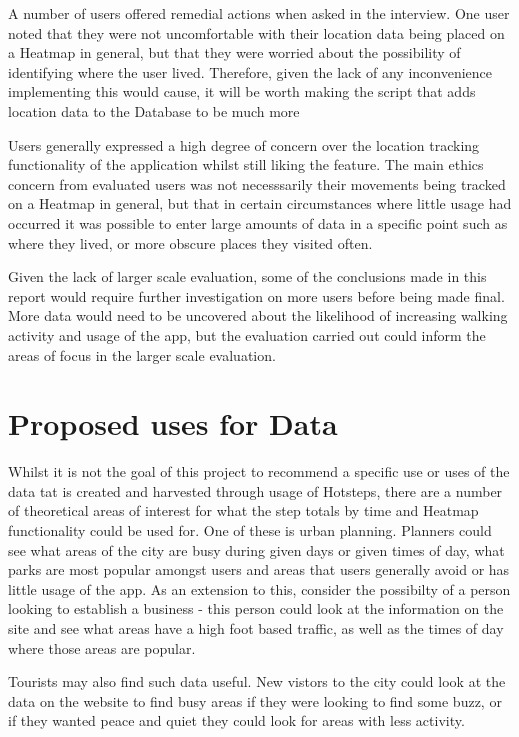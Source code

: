 \documentclass{l4proj}
\begin{document}
A number of users offered remedial actions when asked in the interview. One user noted that they were not uncomfortable with their location data being placed on a Heatmap in general, but that they were worried about the possibility of identifying where the user lived. Therefore, given the lack of any inconvenience implementing this would cause, it will be worth making the script that adds location data to the Database to be much more 

Users generally expressed a high degree of concern over the location tracking functionality of the application whilst still liking the feature. The main ethics concern from evaluated users was not necesssarily their movements being tracked on a Heatmap in general, but that in certain circumstances where little usage had occurred it was possible to enter large amounts of data in a specific point such as where they lived, or more obscure places they visited often.

Given the lack of larger scale evaluation, some of the conclusions made in this report would require further investigation on more users before being made final. More data would need to be uncovered about the likelihood of increasing walking activity and usage of the app, but the evaluation carried out could inform the areas of focus in the larger scale evaluation.

\section{Proposed uses for Data}

Whilst it is not the goal of this project to recommend a specific use or uses of the data tat is created and harvested through usage of Hotsteps, there are a number of theoretical areas of interest for what the step totals by time and Heatmap functionality could be used for. One of these is urban planning. Planners could see what areas of the city are busy during given days or given times of day, what parks are most popular amongst users and areas that users generally avoid or has little usage of the app. As an extension to this, consider the possibilty of a person looking to establish a business - this person could look at the information on the site and see what areas have a high foot based traffic, as well as the times of day where those areas are popular.

Tourists may also find such data useful. New vistors to the city could look at the data on the website to find busy areas if they were looking to find some buzz, or if they wanted peace and quiet they could look for areas with less activity.
\end{document}
